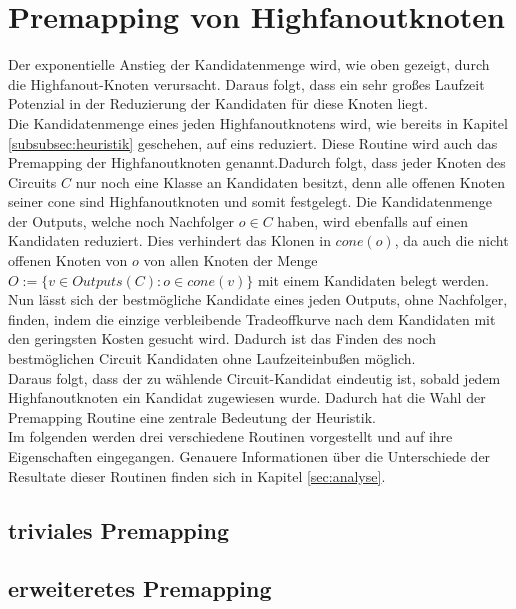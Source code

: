 \documentclass[11pt, a4paper, german]{article}
\begin{document}
 \section{Premapping von Highfanoutknoten}
 \label{sec:premapping}
Der exponentielle Anstieg der Kandidatenmenge wird, wie oben gezeigt, durch die Highfanout-Knoten verursacht. Daraus folgt, dass ein sehr großes Laufzeit Potenzial in der Reduzierung der Kandidaten für diese Knoten liegt. \\
 Die Kandidatenmenge eines jeden Highfanoutknotens wird, wie bereits in Kapitel \ref{subsubsec:heuristik} geschehen, auf eins reduziert. Diese Routine wird auch das Premapping der Highfanoutknoten genannt.Dadurch folgt, dass jeder Knoten des Circuits $C$ nur noch eine Klasse an Kandidaten besitzt, denn alle offenen Knoten seiner cone sind Highfanoutknoten und somit festgelegt.  Die Kandidatenmenge der Outputs, welche noch Nachfolger $o \in C$ haben, wird ebenfalls auf einen Kandidaten reduziert. Dies verhindert das Klonen in $cone(o)$, da  auch die nicht offenen Knoten von $o$ von allen Knoten der Menge $O := \{ v \in Outputs(C): o \in cone(v) \}$ mit einem Kandidaten belegt werden.\\
Nun lässt sich der bestmögliche Kandidate eines jeden Outputs, ohne Nachfolger, finden, indem die einzige verbleibende Tradeoffkurve nach dem Kandidaten mit den geringsten Kosten gesucht wird. Dadurch ist das Finden des noch bestmöglichen Circuit Kandidaten ohne Laufzeiteinbußen möglich. \\
Daraus folgt, dass der zu wählende Circuit-Kandidat eindeutig ist, sobald jedem Highfanoutknoten ein Kandidat zugewiesen wurde. Dadurch hat die Wahl der Premapping Routine eine zentrale Bedeutung der Heuristik.\\
Im folgenden werden drei verschiedene Routinen vorgestellt und auf ihre Eigenschaften eingegangen. Genauere Informationen über die Unterschiede der Resultate dieser Routinen finden sich in Kapitel \ref{sec:analyse}.

\subsection{triviales Premapping}
\label{subsec:triviales_premapping}
 
\subsection{erweiteretes Premapping}
\label{subsec:erweitertes_premapping}
 
\end{document}
